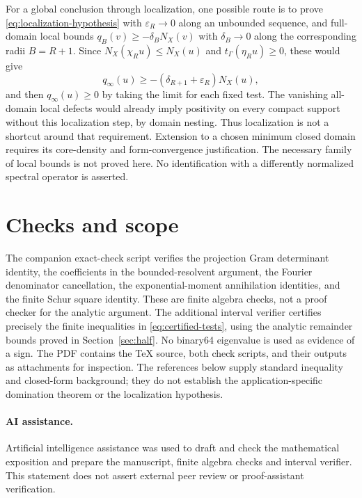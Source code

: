 \documentclass[11pt]{article}
\begin{document}
For a global conclusion through localization, one possible route is to prove \eqref{eq:localization-hypothesis} with
$\varepsilon_R\to0$ along an unbounded sequence, and full-domain local
bounds $q_B(v)\ge-\delta_BN_X(v)$ with $\delta_B\to0$ along the
corresponding radii $B=R+1$. Since $N_X(\chi_Ru)\le N_X(u)$ and
$t_\Gamma(\eta_Ru)\ge0$, these would give
\[
 q_\infty(u)\ge-(\delta_{R+1}+\varepsilon_R)N_X(u),
\]
and then $q_\infty(u)\ge0$ by taking the limit for each fixed test.
The vanishing all-domain local defects would already imply positivity
on every compact support without this localization step, by domain
nesting. Thus localization is not a shortcut around that requirement.
Extension to a chosen minimum closed domain requires its core-density
and form-convergence justification. The necessary family of local
bounds is not proved here. No identification with a differently
normalized spectral operator is asserted.

\section{Checks and scope}
The companion exact-check script verifies the projection Gram determinant
identity, the coefficients in the bounded-resolvent argument, the Fourier
denominator cancellation, the exponential-moment annihilation identities,
and the finite Schur square identity. These are finite algebra checks,
not a proof checker for the analytic argument. The additional interval verifier certifies precisely the finite
inequalities in \eqref{eq:certified-tests}, using the analytic remainder
bounds proved in Section~\ref{sec:half}. No binary64 eigenvalue is used
as evidence of a sign. The PDF contains the TeX source, both check
scripts, and their outputs as attachments for inspection.
The references below supply standard inequality and closed-form
background; they do not establish the application-specific domination
theorem or the localization hypothesis.

\paragraph{AI assistance.}
Artificial intelligence assistance was used to draft and check the
mathematical exposition and prepare the manuscript, finite algebra checks and interval verifier. This statement does not assert external peer review or
proof-assistant verification.
\end{document}
